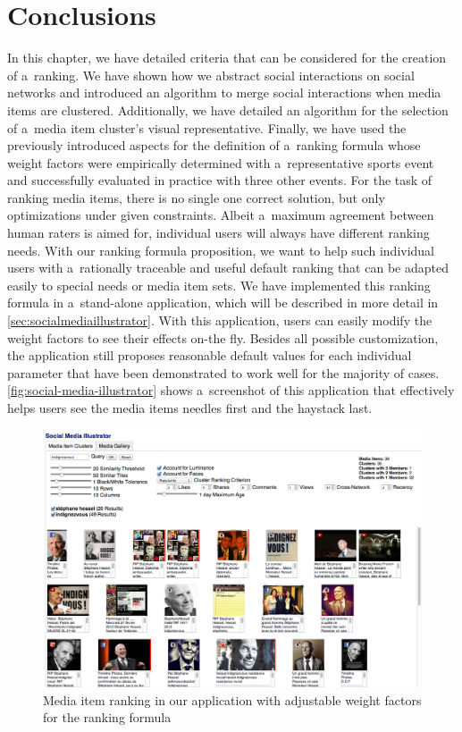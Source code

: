 \section{Conclusions}

In this chapter, we have detailed criteria
that can be considered for the creation of a~ranking.
We have shown how we abstract social interactions on social networks
and introduced an algorithm to merge social interactions
when media items are clustered.
Additionally, we have detailed an algorithm
for the selection of a~media item cluster's visual representative.
Finally, we have used the previously introduced aspects
for the definition of a~ranking formula
whose weight factors were empirically determined
with a~representative sports event
and successfully evaluated in practice with three other events.
For the task of ranking media items, there is no single one correct solution,
but only optimizations under given constraints.
Albeit a~maximum agreement between human raters is aimed for,
individual users will always have different ranking needs.
With our ranking formula proposition, we want to help
such individual users with a~rationally traceable and useful default ranking
that can be adapted easily to special needs or media item sets.
We have implemented this ranking formula in a~stand-alone application,%
which will be described in more detail in \autoref{sec:socialmediaillustrator}.
With this application,
users can easily modify the weight factors
to see their effects on-the fly.
Besides all possible customization,
the application still proposes reasonable default values
for each individual parameter that have been demonstrated
to work well for the majority of cases.
\autoref{fig:social-media-illustrator} shows a~screenshot of this application
that effectively helps users see the media items needles first
and the haystack last.

\begin{figure}[!ht]
  \centering
  \includegraphics[width=1.0\linewidth]{social-media-illustrator.png}
  \caption[Media item ranking in our application with adjustable weight factors]
  {Media item ranking in our application with adjustable weight factors for the ranking formula}
  \label{fig:social-media-illustrator}
\end{figure}

